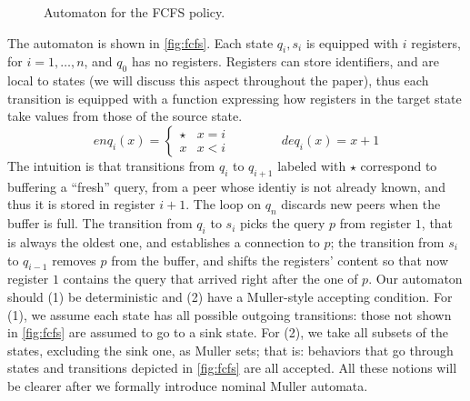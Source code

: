 \begin{figure}[t]
\begin{tikzpicture}[->,shorten >=1pt,auto,node distance=2.8cm,semithick,initial text={},scale=1, every node/.style={scale=1}]
	

\end{tikzpicture}
\caption{Automaton for the FCFS policy.}
\label{fig:fcfs}
\end{figure}
%
The automaton is shown in \autoref{fig:fcfs}. Each state $q_i,s_i$ is equipped with $i$ registers, for $i=1,\dots,n$, and $q_0$ has no registers. Registers can store identifiers, and are local to states (we will discuss this aspect throughout the paper), thus each transition is equipped with a function expressing how registers in the target state take values from those of the source state.
\[
	enq_i(x) = 
	\begin{cases}
		\star & x = i \\
		x & x < i
	\end{cases}
	\qquad
	\qquad
	deq_i(x) = x + 1
\]
%
The intuition is that transitions from $q_i$ to $q_{i+1}$ labeled with $\star$ correspond to buffering a ``fresh'' query, from a peer whose identiy is not already known, and thus it is stored in register $i+1$. The loop on $q_n$ discards new peers when the buffer is full. The transition from $q_i$ to $s_i$ picks the query $p$ from register $1$, that is always the oldest one, and establishes a connection to $p$;
the transition from $s_i$ to $q_{i-1}$ removes $p$ from the buffer, and shifts the registers' content so that now register $1$ contains the query that arrived right after the one of $p$. Our automaton should (1) be deterministic and (2) have a Muller-style accepting condition. For (1), we assume each state has all possible outgoing transitions: those not shown in \autoref{fig:fcfs} are assumed to go to a sink state. For (2), we take all subsets of the states, excluding the sink one, as Muller sets; that is: behaviors that go through states and transitions depicted in \autoref{fig:fcfs} are all accepted. All these notions will be clearer after we formally introduce nominal Muller automata.

%

